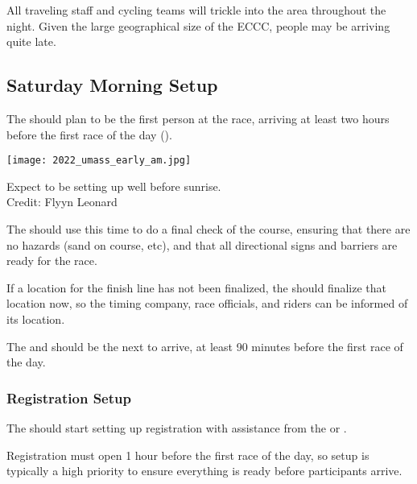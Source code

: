 All traveling staff and cycling teams will trickle into the area throughout the night.
Given the large geographical size of the ECCC, people may be arriving quite late.

\subsection{Saturday Morning Setup}

The  should plan to be the first person at the race, arriving at least two hours before the first race of the day
().

\begin{marginfigure}
  \texttt{[image: 2022\_umass\_early\_am.jpg]}
  \caption[Early morning race setup]{Expect to be setting up well before sunrise.\\
            Credit: Flyyn Leonard}
\end{marginfigure}

The  should use this time to do a final check of the course,
ensuring that there are no hazards (sand on course, etc),
and that all directional signs and barriers are ready for the race.

If a location for the finish line has not been finalized, the  should finalize that location now,
so the timing company, race officials, and riders can be informed of its location.

The  and  should be the next to arrive, at least 90 minutes before the first race of the day.

\subsubsection{Registration Setup}

The  should start setting up registration with assistance from the  or .

Registration must open 1 hour before the first race of the day, so setup is typically a high priority to ensure everything is ready before participants arrive.

